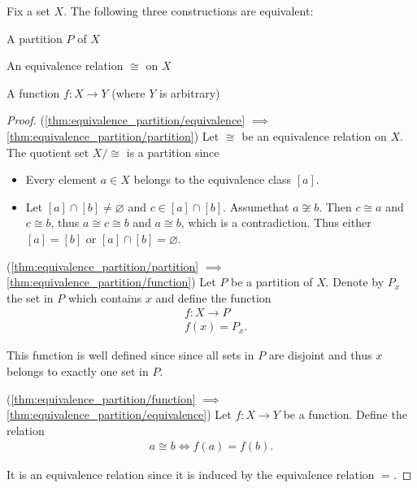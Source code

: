 \begin{proposition}\label{thm:equivalence_partition}
  Fix a set $X$. The following three constructions are equivalent:
  \begin{defenum}
    \item\label{thm:equivalence_partition/partition} A partition $P$ of $X$
    \item\label{thm:equivalence_partition/equivalence} An equivalence relation $\cong$ on $X$
    \item\label{thm:equivalence_partition/function} A function $f: X \to Y$ (where $Y$ is arbitrary)
  \end{defenum}
\end{proposition}
\begin{proof}
  (\ref{thm:equivalence_partition/equivalence} $\implies$ \ref{thm:equivalence_partition/partition}) Let $\cong$ be an equivalence relation on $X$. The quotient set $X / \cong$ is a partition since
  \begin{itemize}
    \item Every element $a \in X$ belongs to the equivalence class $[a]$.
    \item Let $[a] \cap [b] \neq \varnothing$ and $c \in [a] \cap [b]$. Assume\LEM that $a \not\cong b$. Then $c \cong a$ and $c \cong b$, thus $a \cong c \cong b$ and $a \cong b$, which is a contradiction. Thus either $[a] = [b]$ or $[a] \cap [b] = \varnothing$.
  \end{itemize}

  (\ref{thm:equivalence_partition/partition} $\implies$ \ref{thm:equivalence_partition/function}) Let $P$ be a partition of $X$. Denote by $P_x$ the set in $P$ which contains $x$ and define the function
  \begin{align*}
    &f: X \to P \\
    &f(x) = P_x.
  \end{align*}

  This function is well defined since since all sets in $P$ are disjoint and thus $x$ belongs to exactly one set in $P$.

  (\ref{thm:equivalence_partition/function} $\implies$ \ref{thm:equivalence_partition/equivalence}) Let $f: X \to Y$ be a function. Define the relation
  \begin{align*}
    a \cong b \iff f(a) = f(b).
  \end{align*}

  It is an equivalence relation since it is induced by the equivalence relation $=$.
\end{proof}

